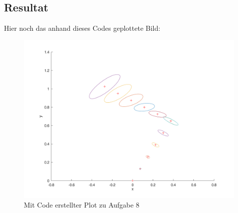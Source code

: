 \documentclass[11pt]{article}
\begin{document}
    \subsection{Resultat}\label{subsec:res}
    Hier noch das anhand dieses Codes geplottete Bild:
    \begin{figure}[H]
        \centering
        \includegraphics[width=15cm]{task8.png}
        \caption{Mit Code erstellter Plot zu Aufgabe 8}
        \label{fig:result}
    \end{figure}
\end{document}
